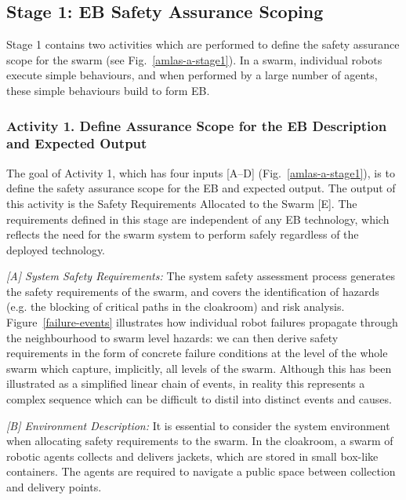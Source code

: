 \documentclass[runningheads]{llncs}
\begin{document}
\subsection{Stage 1: EB Safety Assurance Scoping} \label{framework-stage1}
Stage 1 contains two activities which are performed to define the safety assurance scope for the swarm (see Fig.~\ref{amlas-a-stage1}). In a swarm, individual robots execute simple behaviours, and when performed by a large number of agents, these simple behaviours build to form EB.
\subsubsection*{Activity 1. Define Assurance Scope for the EB Description and Expected Output}
The goal of Activity 1, which has four inputs [A--D] (Fig.~\ref{amlas-a-stage1}), is to define the safety assurance scope for the EB and expected output. 
The output of this activity is the Safety Requirements Allocated to the Swarm [E]. The requirements defined in this stage are independent of any EB technology, which reflects the need for the swarm system to perform safely regardless of the deployed technology. 

\emph{[A] System Safety Requirements:}
The system safety assessment process generates the safety requirements of the swarm, and covers the identification of hazards (e.g. the blocking of critical paths in the cloakroom) and risk analysis.
Figure~\ref{failure-events} illustrates how individual robot failures propagate through the neighbourhood to swarm level hazards: we can then derive safety requirements in the form of concrete failure conditions at the level of the whole swarm which capture, implicitly, all levels of the swarm. 
Although this has been illustrated as a simplified linear chain of events, in reality this represents a complex sequence which can be difficult to distil into distinct events and causes. 

\emph{[B] Environment Description:}
It is essential to consider the system environment when allocating safety requirements to the swarm. 
In the cloakroom, a swarm of robotic agents collects and delivers jackets, which are stored in small box-like containers. 
The agents are required to navigate a public space between collection and delivery points. 
\end{document}
